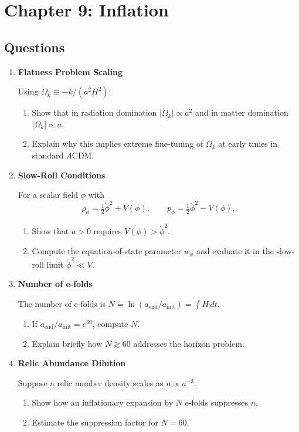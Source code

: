 \clearpage
\section{Chapter 9: Inflation}

\subsection{Questions}

\begin{enumerate}[label=9.\arabic*]
  \item \label{q:9.1} \textbf{Flatness Problem Scaling}
  
  Using $\Omega_k \equiv -k/(a^2H^2)$:
  \begin{enumerate}[label=(\alph*)]
    \item Show that in radiation domination $|\Omega_k|\propto a^2$ and in matter domination
    $|\Omega_k|\propto a$.
    \item Explain why this implies extreme fine-tuning of $\Omega_k$ at early times in
    standard $\Lambda$CDM.
  \end{enumerate}

  \item \label{q:9.2} \textbf{Slow-Roll Conditions}
  
  For a scalar field $\phi$ with
  \[\rho_\phi=\tfrac12\dot\phi^2+V(\phi),\qquad p_\phi=\tfrac12\dot\phi^2-V(\phi),\]
  \begin{enumerate}[label=(\alph*)]
    \item Show that $\ddot a>0$ requires $V(\phi) > \dot\phi^2$.
    \item Compute the equation-of-state parameter $w_\phi$ and evaluate it in the
    slow-roll limit $\dot\phi^2\ll V$.
  \end{enumerate}

  \item \label{q:9.3} \textbf{Number of e-folds}
  
  The number of e-folds is $N=\ln(a_{\mathrm{end}}/a_{\mathrm{init}})=\int H\,dt$.
  \begin{enumerate}[label=(\alph*)]
    \item If $a_{\mathrm{end}}/a_{\mathrm{init}}=e^{60}$, compute $N$.
    \item Explain briefly how $N\gtrsim 60$ addresses the horizon problem.
  \end{enumerate}

  \item \label{q:9.4} \textbf{Relic Abundance Dilution}
  
  Suppose a relic number density scales as $n\propto a^{-3}$.
  \begin{enumerate}[label=(\alph*)]
    \item Show how an inflationary expansion by $N$ e-folds suppresses $n$.
    \item Estimate the suppression factor for $N=60$.
  \end{enumerate}
\end{enumerate}

